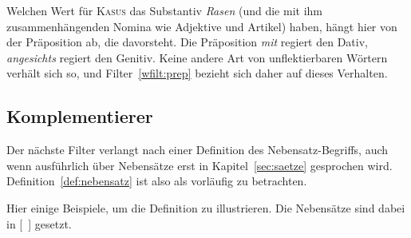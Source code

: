 \begin{exe}
  \ex
  \begin{xlist}
  \end{xlist}
\end{exe}

Welchen Wert für \textsc{Kasus} das Substantiv \textit{Rasen} (und die mit ihm zusammenhängenden Nomina wie Adjektive und Artikel) haben, hängt hier von der Präposition ab, die davorsteht.
Die Präposition \textit{mit} regiert den Dativ, \textit{angesichts} regiert den Genitiv.
Keine andere Art von unflektierbaren Wörtern verhält sich so, und Filter~\ref{wfilt:prep} bezieht sich daher auf dieses Verhalten.


\subsection{Komplementierer}

\label{sec:komplementiererwortklassen}


Der nächste Filter verlangt nach einer Definition des Nebensatz-Begriffs, auch wenn ausführlich über Nebensätze erst in Kapitel~\ref{sec:saetze} gesprochen wird.
Definition~\ref{def:nebensatz} ist also als vorläufig zu betrachten.


Hier einige Beispiele, um die Definition zu illustrieren.
Die Nebensätze sind dabei in [~] gesetzt.

\begin{exe}
\end{exe}

